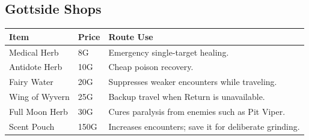 \documentclass[
  american,
  10pt,
  letterpaper,
  oneside,
  open=any]{scrreprt}
\newcounter{none} %
\newenvironment{guidetable}{%
  \small\setstretch{1.0}%
  \setlength{\tabcolsep}{4pt}%
  \setlength{\LTpre}{8pt}\setlength{\LTpost}{10pt}%
  \renewcommand{\arraystretch}{1.16}%
}{ }
\begin{document}
\subsection{Gottside Shops}\label{gottside-shops}

\begin{guidetable}

{\def\LTcaptype{none} %
\begin{longtable}[]{@{}
  >{\raggedright\arraybackslash}p{}
  >{\raggedleft\arraybackslash}p{}
  >{\raggedright\arraybackslash}p{}@{}}
\toprule\noalign{}
\begin{minipage}[b]{\linewidth}\raggedright
\color{GuideGreen}\bfseries Item
\end{minipage} & \begin{minipage}[b]{\linewidth}\raggedleft
\color{GuideGreen}\bfseries Price
\end{minipage} & \begin{minipage}[b]{\linewidth}\raggedright
\color{GuideGreen}\bfseries Route Use
\end{minipage} \\
\midrule\noalign{}
\endhead
\bottomrule\noalign{}
\endlastfoot
Medical Herb & 8G & Emergency single-target healing. \\
Antidote Herb & 10G & Cheap poison recovery. \\
Fairy Water & 20G & Suppresses weaker encounters while traveling. \\
Wing of Wyvern & 25G & Backup travel when Return is unavailable. \\
Full Moon Herb & 30G & Cures paralysis from enemies such as Pit
Viper. \\
Scent Pouch & 150G & Increases encounters; save it for deliberate
grinding. \\
\end{longtable}
}

\end{guidetable}
\end{document}
